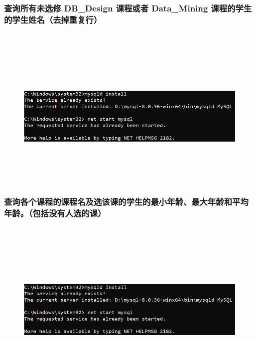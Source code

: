 \documentclass{ctexart}
\begin{document}
\subsubsection{查询所有未选修 DB\_Design 课程或者 Data\_Mining 课程的学生的学生姓名（去掉重复行）}
\begin{lstlisting}[language=sql]
	
\end{lstlisting}
\begin{figure}[H]
	\centering 
	\includegraphics[height=7cm,width=14cm]{1.png}
	\end{figure}
\subsubsection{查询各个课程的课程名及选该课的学生的最小年龄、最大年龄和平均年龄。（包括没有人选的课）}
\begin{lstlisting}[language=sql]
	
\end{lstlisting}
\begin{figure}[H]
	\centering 
	\includegraphics[height=7cm,width=14cm]{1.png}
	\end{figure}
\end{document}
